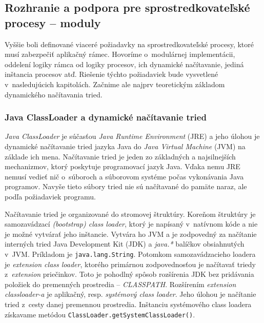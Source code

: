 
\subsection{Rozhranie a podpora pre sprostredkovateľské procesy -- moduly} \label{sec:intermediate_process}

Vyššie boli definované viaceré požiadavky na sprostredkovateľské procesy, ktoré musí zabezpečiť 
aplikačný rámec. Hovoríme o~modulárnej implementácii, oddelení logiky rámca od logiky procesov, 
ich dynamické načítavanie, jediná inštancia procesov atď. Riešenie týchto požiadaviek bude vysvetlené
v~nasledujúcich kapitolách. Začnime ale najprv teoretickým základom dynamického načítavania tried.

\subsubsection{Java ClassLoader a dynamické načítavanie tried} \label{sec:classLoader}

\emph{Java ClassLoader} je súčasťou \emph{Java Runtime Environment} (JRE) a jeho úlohou je dynamické
načítavanie tried jazyka Java do \emph{Java Virtual Machine} (JVM) na základe ich mena. 
Načítavanie tried je jeden zo základných a najsilnejších mechanizmov, ktorý poskytuje programovací jazyk
Java. Vďaka nemu JRE nemusí vedieť nič o~súboroch a súborovom systéme počas vykonávania Java programov. 
Navyše tieto súbory tried nie sú načítavané do pamäte naraz, ale podľa požiadaviek 
programu. \citep{mcmanis, travis}

Načítavanie tried je organizované do stromovej štruktúry. Koreňom štruktúry je samozavádzací 
\emph{(bootstrap) class loader}, ktorý je napísaný v~natívnom kóde a nie je možné vytvárať jeho inštancie. 
Vytvára ho 
JVM a je zodpovedný za načítanie interných tried Java Development Kit (JDK) a \emph{java.*} balíčkov 
obsiahnutých v~JVM. Príkladom je \verb|java.lang.String|. Potomkom samozavádzacieho loadera je 
\emph{extension class loader},
ktorého primárnou zodpovednosťou je načítavať triedy z~\emph{extension} priečinkov. Toto je pohodlný 
spôsob rozšírenia JDK bez pridávania položiek do premenných prostredia -- \emph{CLASSPATH}. 
Rozšírením \emph{extension classloader-a} je aplikačný, resp. \emph{systémový class loader}. Jeho úlohou 
je načítanie tried z~cesty danej premennou prostredia. Inštanciu systémového class loadera získavame 
metódou \verb|ClassLoader.getSystemClassLoader()|. \citep{techjava, antl}

